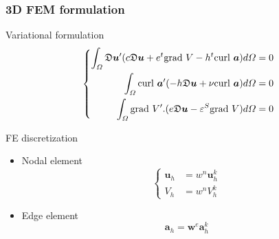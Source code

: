 \documentclass[compress]{beamer}
\begin{document}
\begin{frame}\frametitle{3D FEM formulation}
\begin{exampleblock}{Variational formulation} 
   \begin{equation*}
	\left\{ 
	\begin{aligned}
	\int_{\mathnormal{\Omega}} \mathfrak{D} \boldsymbol{\mathnormal{u}}'(\mathnormal{c}\mathfrak{D}\boldsymbol{\mathnormal{u}} + e^t \text{grad } V -\mathnormal{h}^t \text{curl } \boldsymbol{\mathnormal{a}})\mathnormal{d}\mathnormal{\Omega} & = 0 \\
	\int_{\mathnormal{\Omega}} \text{curl } \boldsymbol{\mathnormal{a}}'(-\mathnormal{h}\mathfrak{D}\boldsymbol{\mathnormal{u}}+\nu \text{curl } \boldsymbol{\mathnormal{a}}) \mathnormal{d}\mathnormal{\Omega} & = 0 \\
	\int_{\mathnormal{\Omega}} \text{grad } V'.(e\mathfrak{D}\boldsymbol{\mathnormal{u}} - \varepsilon^S \text{grad } V) \mathnormal{d}\mathnormal{\Omega} & = 0
	\end{aligned}
	\right.
\end{equation*}
\end{exampleblock}	

\begin{exampleblock}{FE discretization} 
   \begin{itemize}[label=$\bullet$, font=\small, leftmargin=*]
	\item Nodal element
	\begin{equation*}
	\left\{ 
	\begin{aligned}
	\boldsymbol{u}_h & = w^n \boldsymbol{u}_h^k \\
	V_h & = w^n V_h^k
	\end{aligned}
	\right.
	\end{equation*}
	\item Edge element
	\begin{equation*}
	\boldsymbol{a}_h=\boldsymbol{w}^e \boldsymbol{a}_h^k
	\end{equation*}
	\end{itemize}
\end{exampleblock}	
\end{frame}
\end{document}
